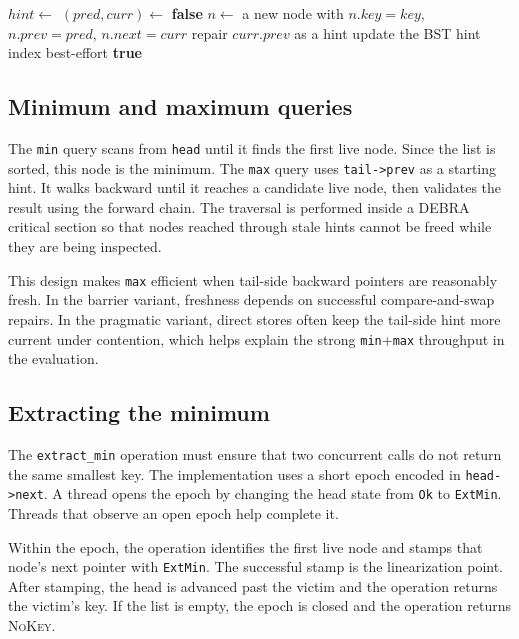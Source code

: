 \documentclass[a4paper,11pt]{article}
\newcommand{\CAS}{\textsc{CAS}}
\newcommand{\NOKey}{\textsc{NoKey}}
\newcommand{\code}[1]{\texttt{#1}}
\begin{document}
\begin{algorithm}[H]
\caption{High-level insertion.}
\label{alg:insert}
\begin{algorithmic}[1]
  \State $hint \gets$ 
  \Loop
    \State $(pred,curr) \gets$ 
      \State \Return \textbf{false}
    \EndIf
    \State $n \gets$ a new node with $n.key=key$, $n.prev=pred$, $n.next=curr$
    \If{\CAS{}$(pred.next, curr, n)$ succeeds}
      \State repair $curr.prev$ as a hint
      \State update the BST hint index best-effort
      \State \Return \textbf{true}
    \EndIf
  \EndLoop
\EndProcedure
\end{algorithmic}
\end{algorithm}

\subsection{Minimum and maximum queries}

The \code{min} query scans from \code{head} until it finds the first live node. Since the list is sorted, this node is the minimum. The \code{max} query uses \code{tail->prev} as a starting hint. It walks backward until it reaches a candidate live node, then validates the result using the forward chain. The traversal is performed inside a DEBRA critical section so that nodes reached through stale hints cannot be freed while they are being inspected.

This design makes \code{max} efficient when tail-side backward pointers are reasonably fresh. In the barrier variant, freshness depends on successful compare-and-swap repairs. In the pragmatic variant, direct stores often keep the tail-side hint more current under contention, which helps explain the strong \code{min}+\code{max} throughput in the evaluation.

\subsection{Extracting the minimum}

The \code{extract\_min} operation must ensure that two concurrent calls do not return the same smallest key. The implementation uses a short epoch encoded in \code{head->next}. A thread opens the epoch by changing the head state from \code{Ok} to \code{ExtMin}. Threads that observe an open epoch help complete it.

Within the epoch, the operation identifies the first live node and stamps that node's next pointer with \code{ExtMin}. The successful stamp is the linearization point. After stamping, the head is advanced past the victim and the operation returns the victim's key. If the list is empty, the epoch is closed and the operation returns \NOKey{}.
\end{document}
